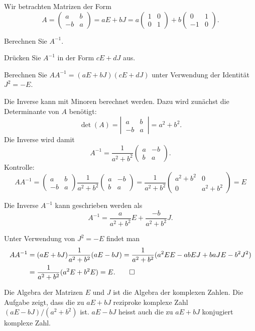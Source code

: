 Wir betrachten Matrizen der Form
\[
A=\begin{pmatrix}a&b\\-b&a\end{pmatrix}
=aE+bJ=a\begin{pmatrix}1&0\\0&1\end{pmatrix}+b\begin{pmatrix}0&1\\-1&0\end{pmatrix}.
\]
\begin{teilaufgaben}
\item
Berechnen Sie $A^{-1}$.
\item
Drücken Sie $A^{-1}$ in der Form $cE+dJ$ aus.
\item
Berechnen Sie $AA^{-1}=(aE+bJ)(cE+dJ)$ unter Verwendung der Identität
$J^2=-E$.
\end{teilaufgaben}


\begin{loesung}
\begin{teilaufgaben}
\item
Die Inverse kann mit Minoren berechnet werden.
Dazu wird zunächst die Determinante von $A$ benötigt:
\[
\det(A)=\left|\,\begin{matrix}a&b\\-b&a\end{matrix}\,\right|=a^2+b^2.
\]
Die Inverse wird damit
\[
A^{-1}=\frac1{a^2+b^2}\begin{pmatrix}a&-b\\b&a\end{pmatrix}.
\]
Kontrolle:
\[
AA^{-1}
=
\begin{pmatrix}a&b\\-b&a\end{pmatrix}
\frac{1}{a^2+b^2}
\begin{pmatrix}a&-b\\b&a\end{pmatrix}
=
\frac{1}{a^2+b^2}
\begin{pmatrix}a^2+b^2&0\\0&a^2+b^2 \end{pmatrix}=E
\]
\item
Die Inverse $A^{-1}$ kann geschrieben werden als
\[
A^{-1}
=
\frac{a}{a^2+b^2}E
+
\frac{-b}{a^2+b^2}J.
\]
\item Unter Verwendung von $J^2=-E$ findet man
\begin{align*}
AA^{-1}&=(aE+bJ)\frac1{a^2+b^2}(aE-bJ)
=\frac1{a^2+b^2}(a^2EE-abEJ+baJE-b^2J^2)
\\
&=\frac1{a^2+b^2}(a^2E+b^2E)=E.
\qedhere
\end{align*}
\end{teilaufgaben}
\end{loesung}

\begin{diskussion}
Die Algebra der Matrizen $E$ und $J$ ist die Algebra der komplexen Zahlen.
Die Aufgabe zeigt, dass die zu $aE+bJ$ reziproke komplexe Zahl
$(aE-bJ)/(a^2+b^2)$ ist.
$aE-bJ$ heisst auch die zu $aE+bJ$ konjugiert komplexe Zahl.
\end{diskussion}

